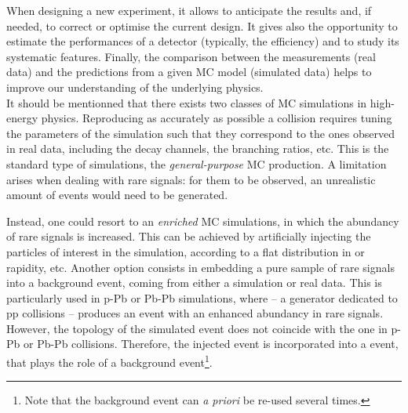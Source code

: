When designing a new experiment, it allows to anticipate the results and, if needed, to correct or optimise the current design. It gives also the opportunity to estimate the performances of a detector (typically, the efficiency) and to study its systematic features. Finally, the comparison between the measurements (real data) and the predictions from a given MC model (simulated data) helps to improve our understanding of the underlying physics.\\

It should be mentionned that there exists two classes of MC simulations in high-energy physics. Reproducing as accurately as possible a collision requires tuning the parameters of the simulation such that they correspond to the ones observed in real data, including the decay channels, the branching ratios, etc. This is the standard type of simulations, the \textit{general-purpose} MC production. A limitation arises when dealing with rare signals: for them to be observed, an unrealistic amount of events would need to be generated. 

Instead, one could resort to an \textit{enriched} MC simulations, in which the abundancy of rare signals is increased. This can be achieved by artificially injecting the particles of interest in the simulation, according to a flat distribution in \pT or rapidity, etc. Another option consists in embedding a pure sample of rare signals into a background event, coming from either a simulation or real data. This is particularly used in p-Pb or Pb-Pb simulations, where \Pythia -- a generator dedicated to pp collisions -- produces an event with an enhanced abundancy in rare signals. However, the topology of the simulated event does not coincide with the one in p-Pb or Pb-Pb collisions. Therefore, the injected event is incorporated into a \Hijing event, that plays the role of a background event\footnote{Note that the background event can \textit{a priori} be re-used several times.}.